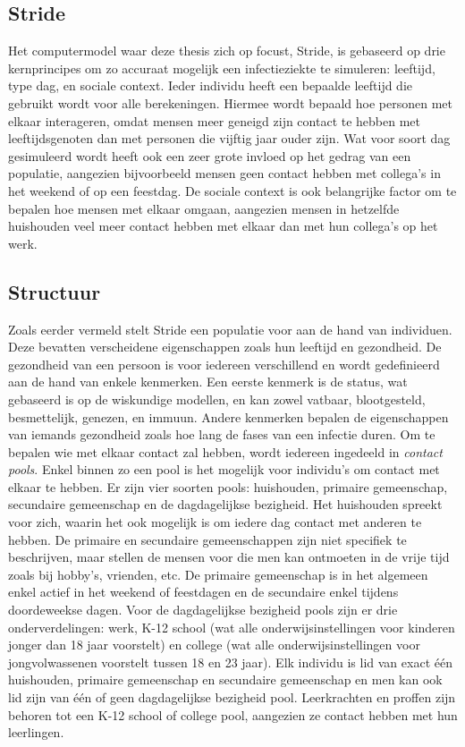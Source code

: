 \begin{appendices}
\section{Stride}
Het computermodel waar deze thesis zich op focust, Stride, is gebaseerd op drie kernprincipes om zo accuraat mogelijk een infectieziekte te simuleren: leeftijd, type dag, en sociale context. Ieder individu heeft een bepaalde leeftijd die gebruikt wordt voor alle berekeningen. Hiermee wordt bepaald hoe personen met elkaar interageren, omdat mensen meer geneigd zijn contact te hebben met leeftijdsgenoten dan met personen die vijftig jaar ouder zijn. Wat voor soort dag gesimuleerd wordt heeft ook een zeer grote invloed op het gedrag van een populatie, aangezien bijvoorbeeld mensen geen contact hebben met collega's in het weekend of op een feestdag. De sociale context is ook belangrijke factor om te bepalen hoe mensen met elkaar omgaan, aangezien mensen in hetzelfde huishouden veel meer contact hebben met elkaar dan met hun collega's op het werk.

\subsection{Structuur}
Zoals eerder vermeld stelt Stride een populatie voor aan de hand van individuen. Deze bevatten verscheidene eigenschappen zoals hun leeftijd en gezondheid. De gezondheid van een persoon is voor iedereen verschillend en wordt gedefinieerd aan de hand van enkele kenmerken. Een eerste kenmerk is de status, wat gebaseerd is op de wiskundige modellen, en kan zowel vatbaar, blootgesteld, besmettelijk, genezen, en immuun. Andere kenmerken bepalen de eigenschappen van iemands gezondheid zoals hoe lang de fases van een infectie duren. Om te bepalen wie met elkaar contact zal hebben, wordt iedereen ingedeeld in \textit{contact pools}. Enkel binnen zo een pool is het mogelijk voor individu's om contact met elkaar te hebben. Er zijn vier soorten pools: huishouden, primaire gemeenschap, secundaire gemeenschap en de dagdagelijkse bezigheid. Het huishouden spreekt voor zich, waarin het ook mogelijk is om iedere dag contact met anderen te hebben. De primaire en secundaire gemeenschappen zijn niet specifiek te beschrijven, maar stellen de mensen voor die men kan ontmoeten in de vrije tijd zoals bij hobby's, vrienden, etc. De primaire gemeenschap is in het algemeen enkel actief in het weekend of feestdagen en de secundaire enkel tijdens doordeweekse dagen. Voor de dagdagelijkse bezigheid pools zijn er drie onderverdelingen: werk, K-12 school (wat alle onderwijsinstellingen voor kinderen jonger dan 18 jaar voorstelt) en college (wat alle onderwijsinstellingen voor jongvolwassenen voorstelt tussen 18 en 23 jaar). Elk individu is lid van exact één huishouden, primaire gemeenschap en secundaire gemeenschap en men kan ook lid zijn van één of geen dagdagelijkse bezigheid pool. Leerkrachten en proffen zijn behoren tot een K-12 school of college pool, aangezien ze contact hebben met hun leerlingen.


\end{appendices}
